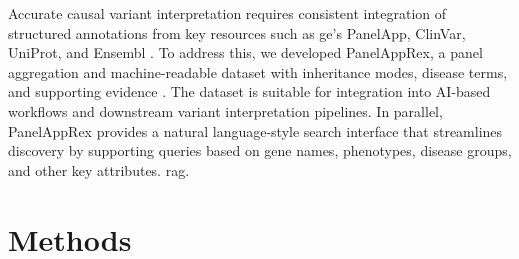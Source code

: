 Accurate causal variant interpretation requires consistent integration of structured annotations from key resources such as \ac{ge}’s PanelApp, ClinVar, UniProt, and Ensembl \cite{martin_panelapp_2019, landrum_clinvar_2018, the_uniprot_consortium_uniprot_2025, dyer_ensembl_2025}. 
To address this, we developed PanelAppRex, a \DIFdelbegin {}\DIFdelend panel aggregation and \DIFdelbegin {}\DIFdelend machine-readable dataset with \DIFdelbegin {}\DIFdelend \DIFaddbegin {}\DIFaddend inheritance modes, disease terms, and supporting evidence \DIFaddbegin {}\DIFaddend .
The dataset is suitable for integration into AI-based workflows and downstream variant interpretation pipelines. 
In parallel, PanelAppRex provides a natural language-style search interface that streamlines discovery by supporting queries based on gene names, phenotypes, disease groups, and other key attributes. 
\DIFdelbegin {}\DIFdelend \DIFaddbegin {}\DIFaddend \ac{rag}\DIFdelbegin {}\DIFdelend \DIFaddbegin {}\DIFaddend .

\section{Methods}

